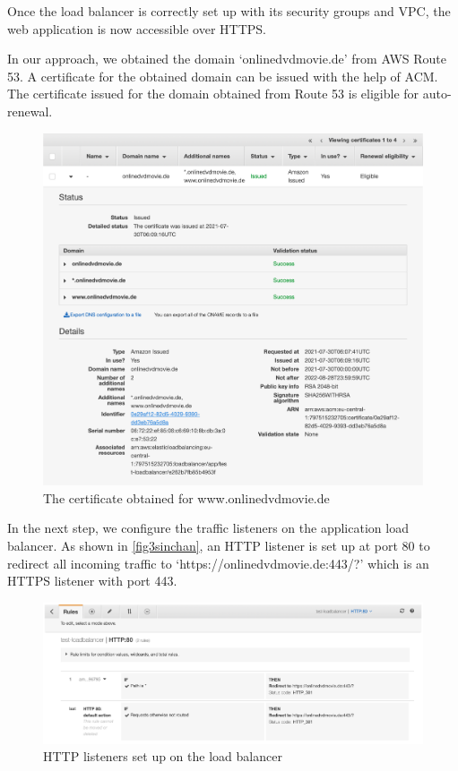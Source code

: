 Once the load balancer is correctly set up with its security groups and VPC, the web application is now accessible over HTTPS.



In our approach, we obtained the domain ‘onlinedvdmovie.de’ from AWS Route 53. A certificate for the obtained domain can be issued with the help of ACM. The certificate issued for the domain obtained from Route 53 is eligible for auto-renewal.


\begin{figure}[h]
\centerline{\includegraphics[scale=.50]{images/Sinchan/6sinchan.png}}
\caption{The certificate obtained for www.onlinedvdmovie.de}
\label{fig6sinchan}
\end{figure}

In the next step, we configure the traffic listeners on the application load balancer. As shown in \autoref{fig3sinchan}, an HTTP listener is set up at port 80 to redirect all incoming traffic to ‘https://onlinedvdmovie.de:443/?’ which is an HTTPS listener with port 443.


\begin{figure}[h]
\centerline{\includegraphics[scale=.38]{images/Sinchan/3sinchan.png}}
\caption{HTTP listeners set up on the load balancer}
\label{fig3sinchan}
\end{figure}




